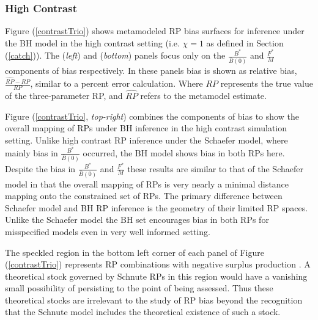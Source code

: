 \subsubsection{High Contrast \label{highConRes}}

%
Figure (\ref{contrastTrio}) shows metamodeled RP bias surfaces for inference
under the BH model in the high contrast setting (i.e. $\chi=1$ as defined in Section (\ref{catch})). 
The (\emph{left}) and (\emph{bottom}) panels focus only on the $\frac{B^*}{\bar B(0)}$ and
$\frac{F^*}{M}$ components of bias respectively. In these panels bias is shown
as relative bias, $\frac{\widehat{RP}-RP}{RP}$, similar to a percent error calculation.
Where $RP$ represents the true value of the three-parameter RP, and $\widehat{RP}$ 
refers to the metamodel estimate.

%
Figure (\ref{contrastTrio}, \emph{top-right}) combines the components of bias to
show the overall mapping of RPs under BH inference in the high contrast
simulation setting. Unlike high contrast RP inference under the Schaefer model,
where mainly bias in $\frac{B^*}{\bar B(0)}$ occurred, the BH model shows
bias in both RPs here. Despite the bias in $\frac{B^*}{\bar B(0)}$ and
$\frac{F^*}{M}$ these results are similar to that of the Schaefer model in
that the overall mapping of RPs is very nearly a minimal distance mapping onto
the constrained set of RPs. %
The primary difference between Schaefer model and BH RP inference is the
geometry of their limited RP spaces. Unlike the Schaefer model the BH set
encourages bias in both RPs for misspecified models even in very well informed
setting.

%
The speckled region in the bottom left corner of each panel of Figure (\ref{contrastTrio}) 
represents RP combinations with negative surplus production \cite{myers_maximum_1999, punt_extending_2019}. 
A theoretical stock governed by Schnute RPs in this region would have a 
vanishing small possibility of persisting to the point of being assessed. 
Thus these theoretical stocks are irrelevant to the study of RP bias beyond 
the recognition that the Schnute model includes the theoretical existence of 
such a stock.  


%


